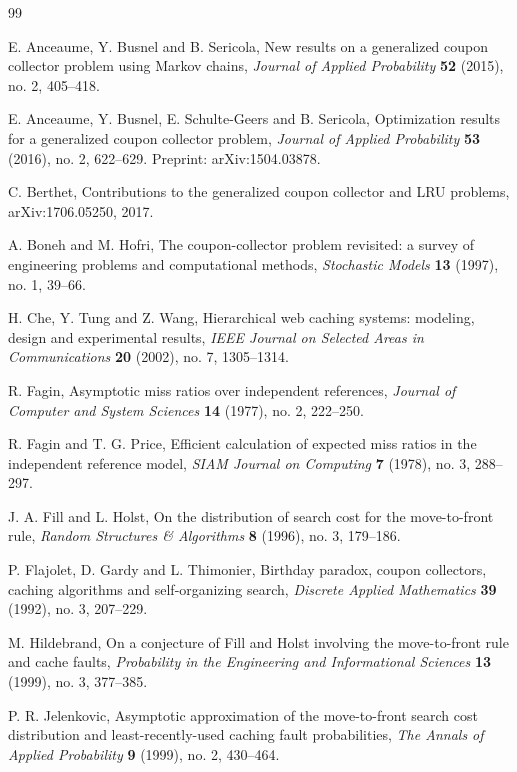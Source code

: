 \documentclass[11pt]{article}
\newcommand{\1}{\mathbf 1}
\begin{document}
\begin{thebibliography}{99}

E. Anceaume, Y. Busnel and B. Sericola,
New results on a generalized coupon collector problem using Markov chains,
\emph{Journal of Applied Probability} \textbf{52} (2015), no. 2, 405--418.

E. Anceaume, Y. Busnel, E. Schulte-Geers and B. Sericola,
Optimization results for a generalized coupon collector problem,
\emph{Journal of Applied Probability} \textbf{53} (2016), no. 2, 622--629.
Preprint: arXiv:1504.03878.

C. Berthet,
Contributions to the generalized coupon collector and LRU problems,
arXiv:1706.05250, 2017.

A. Boneh and M. Hofri,
The coupon-collector problem revisited: a survey of engineering problems and computational methods,
\emph{Stochastic Models} \textbf{13} (1997), no. 1, 39--66.

H. Che, Y. Tung and Z. Wang,
Hierarchical web caching systems: modeling, design and experimental results,
\emph{IEEE Journal on Selected Areas in Communications} \textbf{20} (2002), no. 7, 1305--1314.

R. Fagin,
Asymptotic miss ratios over independent references,
\emph{Journal of Computer and System Sciences} \textbf{14} (1977), no. 2, 222--250.

R. Fagin and T. G. Price,
Efficient calculation of expected miss ratios in the independent reference model,
\emph{SIAM Journal on Computing} \textbf{7} (1978), no. 3, 288--297.

J. A. Fill and L. Holst,
On the distribution of search cost for the move-to-front rule,
\emph{Random Structures \& Algorithms} \textbf{8} (1996), no. 3, 179--186.

P. Flajolet, D. Gardy and L. Thimonier,
Birthday paradox, coupon collectors, caching algorithms and self-organizing search,
\emph{Discrete Applied Mathematics} \textbf{39} (1992), no. 3, 207--229.

M. Hildebrand,
On a conjecture of Fill and Holst involving the move-to-front rule and cache faults,
\emph{Probability in the Engineering and Informational Sciences} \textbf{13} (1999), no. 3, 377--385.

P. R. Jelenkovic,
Asymptotic approximation of the move-to-front search cost distribution and least-recently-used caching fault probabilities,
\emph{The Annals of Applied Probability} \textbf{9} (1999), no. 2, 430--464.


\end{thebibliography}
\end{document}
